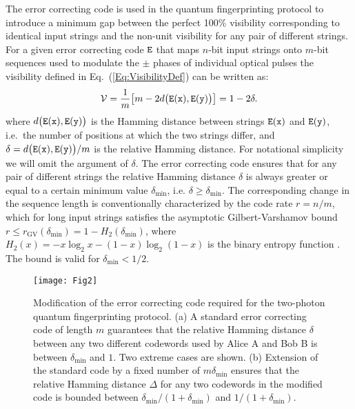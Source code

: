 \documentclass[10pt]{article}
\begin{document}
The error correcting code is used in the quantum fingerprinting protocol to introduce a minimum gap between the perfect 100\% visibility corresponding to identical input strings and the non-unit visibility for any pair of different strings. For a given error correcting code ${\tt E}$ that maps $n$-bit input strings onto $m$-bit sequences used to modulate the $\pm$ phases of individual optical pulses the visibility defined in Eq.~(\ref{Eq:VisibilityDef}) can be written as:
\begin{equation}
{\cal V}=\frac{1}{m}\bigl[m-2d\bigl({\tt E}({\tt x}),{\tt E}({\tt y})\bigr)\bigr] =1-2\delta.\label{eq:Visibility}
\end{equation}
where $d\bigl({\tt E}({\tt x}),{\tt E}({\tt y})\bigr)$ is the Hamming distance between strings ${\tt E}({\tt x})$ and ${\tt E}({\tt y})$, i.e.\ the number of positions at which the two strings differ, and $\delta = d\bigl({\tt E}({\tt x}),{\tt E}({\tt y})\bigr)/m$ is the relative Hamming distance. For notational simplicity we will omit the argument of $\delta$.
The error correcting code ensures that for any pair of different strings the relative Hamming distance $\delta$ is always greater or equal to a certain minimum value $\delta_{\text{min}}$, i.e. $\delta \ge \delta_{\text{min}}$. The corresponding change in the sequence length is conventionally characterized by the code rate $r = n/m$, which for long input strings satisfies the asymptotic Gilbert-Varshamov bound
$r \le r_{\text{GV}}(\delta_{\text{min}}) = 1-H_{2}(\delta_{\textrm{min}})$, where
$H_{2}(x)=-x\log_{2}x-(1-x)\log_{2}(1-x)$ is the binary entropy function \cite{Lint}. The bound is valid for $\delta_{\textrm{min}} < 1/2$.

\begin{figure}
\texttt{[image: Fig2]}\centering
\caption{Modification of the error correcting code required for the two-photon quantum fingerprinting protocol.
(a) A standard error correcting code of length $m$ guarantees that the relative Hamming distance $\delta$ between any two different codewords used by Alice A and Bob B is between $\delta_{\text{min}}$ and $1$. Two extreme cases are shown. (b) Extension of the standard code by a fixed number of $m\delta_{\text{min}}$ ensures that the relative Hamming distance $\Delta$ for any two codewords in the modified code is bounded between $\delta_{\textrm{min}}/(1+\delta_{\textrm{min}})$ and $1/(1+\delta_{\textrm{min}})$.
\label{fig:Hamming_distance}}
\end{figure}
\end{document}
